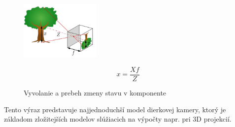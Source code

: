\begin{figure}[H]
    \centering
    \begin{minipage}[p]{0.49\textwidth}
        \centering
        \includegraphics[width=3.9cm]{images/holeCamera}
        \caption{Vyvolanie a prebeh zmeny stavu v komponente}
    \end{minipage}
    \hfill
    \begin{minipage}[p]{0.4\textwidth}
        \centering
        $$\textit{x}=\frac{X\textit{f}}{Z}$$
        \vspace*{1.2cm}
    \end{minipage}
\end{figure}

Tento výraz predstavuje najjednoduchší model dierkovej kamery, ktorý je základom zložitejších modelov slúžiacich na výpočty napr. pri 3D projekcií. 

